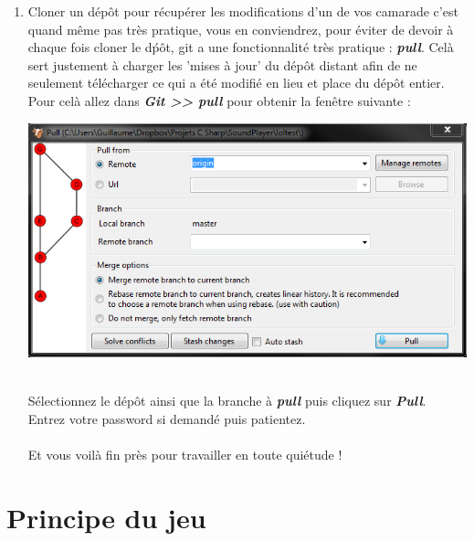\documentclass[a4paper]{article}
\begin{document}
\begin{enumerate}
    \item Cloner un d\'epôt pour r\'ecup\'erer les modifications d'un de vos
	camarade c'est quand même pas très pratique, vous en conviendrez, pour
	\'eviter de devoir à chaque fois cloner le d\'pôt, git a une
	fonctionnalit\'e très pratique : \textbf{\emph{pull}}. Celà sert
	justement à charger les 'mises à jour' du d\'epôt distant afin de ne
    seulement t\'el\'echarger ce qui a \'et\'e modifi\'e en lieu et place du
    d\'epôt entier.\\
    Pour celà allez dans \textbf{\emph{Git >> pull}} pour obtenir la fenêtre
    suivante : \\
    \begin{center}
	\includegraphics[scale=0.7]{img/VS_pull.png}
    \end{center}
\\
S\'electionnez le d\'epôt ainsi que la branche à \textbf{\emph{pull}} puis
cliquez sur \textbf{\emph{Pull}}. Entrez votre password si demand\'e puis
patientez.
\\
\\
Et vous voilà fin près pour travailler en toute qui\'etude !
\end{enumerate}

\section{Principe du jeu}
\end{document}

